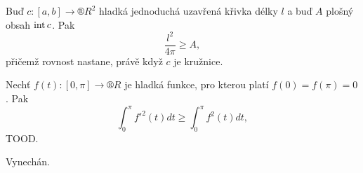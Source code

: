 \documentclass[12pt]{article}					%
\begin{document}
\begin{veta}
	Buď $c: [a, b] \rightarrow ®R^2$ hladká jednoduchá uzavřená křivka délky $l$ a buď $A$ plošný obsah $\operatorname{int} c$. Pak
	$$ \frac{l^2}{4\pi} ≥ A, $$
	přičemž rovnost nastane, právě když $c$ je kružnice.
\end{veta}

\begin{lemma}[Wirtinger]
	Nechť $f(t): [0, \pi] \rightarrow ®R$ je hladká funkce, pro kterou platí $f(0) = f(\pi) = 0$. Pak
	$$ \int_0^\pi f'^2(t)dt ≥ \int_0^\pi f^2(t)dt, $$
	TOOD.

	\begin{dukazin}
		Vynechán.
	\end{dukazin}
\end{lemma}
\end{document}
